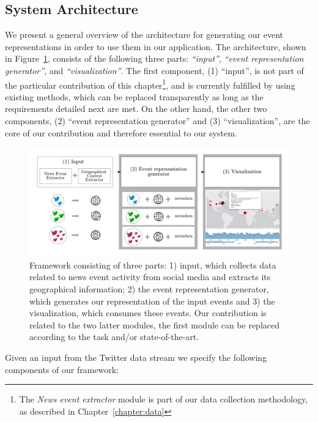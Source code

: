 \subsection{System Architecture}\label{sec:framework}

We present a general overview of the architecture for generating our event
representations in order to use them in our application.  
%
The architecture, shown in Figure~\ref{fig:sys_architecture}, consists of the
following three parts: {\em ``input''}, {\em ``event representation
generator''}, and {\em ``visualization''}.  
%
The first component, (1) ``input'', is not part of the particular contribution
of this chapter\footnote{The {\it News event extractor} module is part of our
data collection methodology, as described in Chapter~\ref{chapter:data}}, and is
currently fulfilled by using existing methods, which can be replaced
transparently as long as the requirements detailed next are met. 
%
On the other hand, the other two components, (2) ``event representation
generator'' and (3) ``visualization'', are the core of our contribution and
therefore essential to our system.


\begin{figure}[t]
    \includegraphics[width=\textwidth]{figures/geopolitical/architecture.pdf}
    \caption[Data architecture for Spatio-Temporal Model.]
    {Framework consisting of three parts: 1) input, which collects data related
    to news event activity from social media and extracts its geographical
    information; 2) the event representation generator, which generates our
    representation of the input events and 3) the visualization, which consumes
    these events. Our contribution is related to the two latter modules, the
    first module can be replaced according to the task and/or state-of-the-art.}
    \label{fig:sys_architecture}
\end{figure}

Given an input from the Twitter data stream we specify the following components
of our framework:

